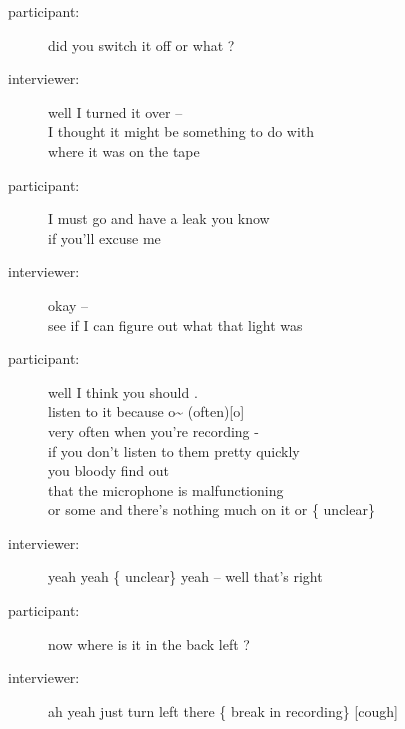 \documentclass{article}
\newcommand{\turn}[2]{
\item[#1:] #2
}
\begin{document}
\begin{description}
\turn{participant}{did you switch it off or what ?}

\turn{interviewer}{well I turned it over --\\
I thought it might be something to do with\\
where it was on the tape}

\turn{participant}{I must go and have a leak you know\\
if you'll excuse me}

\turn{interviewer}{okay --\\
see if I can figure out what that light was}

\turn{participant}{well I think you should .\\
listen to it because o\~{} (often)[o]\\
very often when you're recording -\\
if you don't listen to them pretty quickly\\
you bloody find out\\
that the microphone is malfunctioning\\
or some and there's nothing much on it or \{ unclear\} }

\turn{interviewer}{yeah yeah \{ unclear\}  yeah -- well that's right}

\turn{participant}{now where is it in the back left ?}

\turn{interviewer}{ah yeah just turn left there \{ break in recording\}  [cough]}


\end{description}
\end{document}

